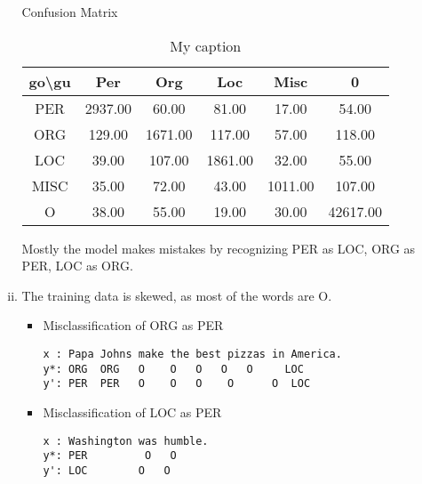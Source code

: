 \documentclass{article}[11pt]
\begin{document}
\begin{enumerate}[(a)]
\begin{enumerate}[i.]
	Confusion Matrix
	\begin{table}[H]
		\centering
		\caption{My caption}
		\label{my-label}
		\begin{tabular}{|c|c|c|c|c|c|}
		\hline
		go\textbackslash gu & Per & Org & Loc & Misc & 0 
		\\ \hline
		PER    	&	2937.00  & 	60.00  &	81.00   &	17.00   &	54.00 \\ \hline  
		ORG     &	129.00  &	1671.00 &	117.00  &	57.00   &	118.00  \\ \hline
		LOC     &	39.00   &	107.00  &	1861.00 &	32.00   &	55.00   \\ \hline
		MISC    &	35.00   &	72.00   &	43.00   &	1011.00 &	107.00  \\ \hline
		O       &	38.00   &	55.00   &	19.00   &	30.00   &	42617.00 \\ \hline
		\end{tabular}
		\end{table}
 Mostly the model makes mistakes by recognizing PER as LOC, ORG as PER, LOC as ORG.
 \item The training data is skewed, as most of the words are O. 
 \begin{itemize}
 	\item Misclassification of ORG as PER
\begin{verbatim}
x : Papa Johns make the best pizzas in America. 
y*: ORG  ORG   O	O 	O	O	O     LOC                                          
y': PER  PER   O    O   O    O      O  LOC
\end{verbatim}
\item Misclassification of LOC as PER
\begin{verbatim}
x : Washington was humble. 
y*: PER      	O 	O                       
y': LOC        O   O   
\end{verbatim}
\end{itemize}
 \end{enumerate}
\end{enumerate}
\end{document}
